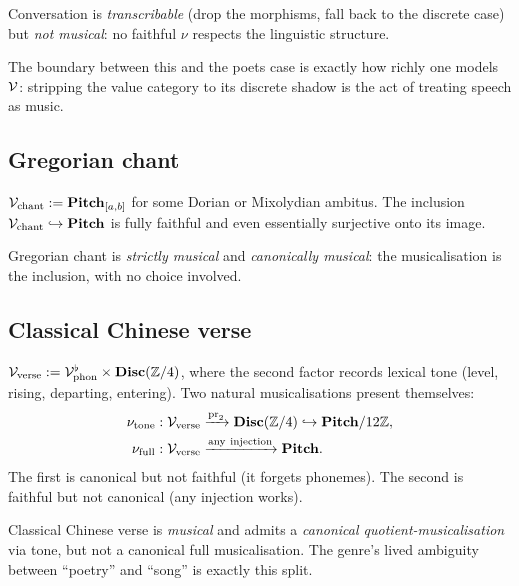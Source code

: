 \begin{verdict}
Conversation is \emph{transcribable} (drop the morphisms, fall back
to the discrete case) but \emph{not musical}: no faithful $\nu$
respects the linguistic structure.
\end{verdict}

\noindent The boundary between this and the poets case is exactly
how richly one models $\mathcal{V}$: stripping the value category to its
discrete shadow is the act of treating speech as music.

\subsection{Gregorian chant}
$\mathcal{V}_{\mathrm{chant}} := \mathbf{Pitch}_{[a,b]}$ for some Dorian or
Mixolydian ambitus. The inclusion
$\mathcal{V}_{\mathrm{chant}} \hookrightarrow \mathbf{Pitch}$ is fully faithful and
even essentially surjective onto its image.

\begin{verdict}
Gregorian chant is \emph{strictly musical} and \emph{canonically
musical}: the musicalisation is the inclusion, with no choice
involved.
\end{verdict}

\subsection{Classical Chinese verse}
$\mathcal{V}_{\mathrm{verse}} := \mathcal{V}_{\mathrm{phon}}^\flat \times \mathbf{Disc}(\mathbb{Z}/4)$,
where the second factor records lexical tone (level, rising,
departing, entering). Two natural musicalisations present themselves:
\begin{align*}
\nu_{\mathrm{tone}} &: \mathcal{V}_{\mathrm{verse}}
   \xrightarrow{\mathrm{pr}_2} \mathbf{Disc}(\mathbb{Z}/4)
   \hookrightarrow \mathbf{Pitch} / 12\mathbb{Z}, \\
\nu_{\mathrm{full}} &: \mathcal{V}_{\mathrm{verse}}
   \xrightarrow{\mathrm{any\ injection}} \mathbf{Pitch}.
\end{align*}
The first is canonical but not faithful (it forgets phonemes). The
second is faithful but not canonical (any injection works).

\begin{verdict}
Classical Chinese verse is \emph{musical} and admits a
\emph{canonical quotient-musicalisation} via tone, but not a
canonical full musicalisation. The genre's lived ambiguity between
``poetry'' and ``song'' is exactly this split.
\end{verdict}

